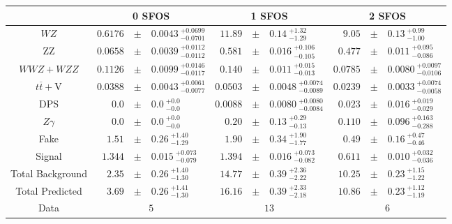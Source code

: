 \renewcommand{\tabcolsep}{2pt}
\begin{tabular}{c|rclrclrcl}
\hline
\hline
 & \multicolumn{3}{c}{0 SFOS} & \multicolumn{3}{c}{1 SFOS} & \multicolumn{3}{c}{2 SFOS}\\ 
\hline
$WZ$ &  $0.6176 $&$\pm$&$ 0.0043~^{+0.0699}_{-0.0701}$ &  $11.89 $&$\pm$&$ 0.14~^{+1.32}_{-1.29}$ &  $9.05 $&$\pm$&$ 0.13~^{+0.99}_{-1.00}$\\ 
ZZ &  $0.0658 $&$\pm$&$ 0.0039~^{+0.0112}_{-0.0112}$ &  $0.581 $&$\pm$&$ 0.016~^{+0.106}_{-0.105}$ &  $0.477 $&$\pm$&$ 0.011~^{+0.095}_{-0.086}$\\ 
$WWZ+WZZ$ &  $0.1126 $&$\pm$&$ 0.0099~^{+0.0146}_{-0.0117}$ &  $0.140 $&$\pm$&$ 0.011~^{+0.015}_{-0.013}$ &  $0.0785 $&$\pm$&$ 0.0080~^{+0.0097}_{-0.0106}$\\ 
$t\overline{t}+$V &  $0.0388 $&$\pm$&$ 0.0043~^{+0.0061}_{-0.0077}$ &  $0.0503 $&$\pm$&$ 0.0048~^{+0.0074}_{-0.0089}$ &  $0.0239 $&$\pm$&$ 0.0033~^{+0.0074}_{-0.0058}$\\ 
DPS &  $0.0 $&$\pm$&$ 0.0~^{+0.0}_{-0.0}$ &  $0.0088 $&$\pm$&$ 0.0080~^{+0.0080}_{-0.0084}$ &  $0.023 $&$\pm$&$ 0.016~^{+0.019}_{-0.029}$\\ 
$Z\gamma$ &  $0.0 $&$\pm$&$ 0.0~^{+0.0}_{-0.0}$ &  $0.20 $&$\pm$&$ 0.13~^{+0.29}_{-0.13}$ &  $0.110 $&$\pm$&$ 0.096~^{+0.163}_{-0.288}$\\ 
Fake &  $1.51 $&$\pm$&$ 0.26~^{+1.40}_{-1.29}$ &  $1.90 $&$\pm$&$ 0.34~^{+1.90}_{-1.77}$ &  $0.49 $&$\pm$&$ 0.16~^{+0.47}_{-0.46}$\\ 
Signal &  $1.344 $&$\pm$&$ 0.015~^{+0.073}_{-0.079}$ &  $1.394 $&$\pm$&$ 0.016~^{+0.073}_{-0.082}$ &  $0.611 $&$\pm$&$ 0.010~^{+0.032}_{-0.036}$\\ 
\hline
Total Background &  $2.35 $&$\pm$&$ 0.26~^{+1.40}_{-1.30}$ &  $14.77 $&$\pm$&$ 0.39~^{+2.36}_{-2.22}$ &  $10.25 $&$\pm$&$ 0.23~^{+1.15}_{-1.22}$\\ 
Total Predicted &  $3.69 $&$\pm$&$ 0.26~^{+1.41}_{-1.30}$ &  $16.16 $&$\pm$&$ 0.39~^{+2.33}_{-2.18}$ &  $10.86 $&$\pm$&$ 0.23~^{+1.12}_{-1.19}$\\ 
\hline
Data &  \multicolumn{3}{c}{$5$} &  \multicolumn{3}{c}{$13$} &  \multicolumn{3}{c}{$6$}\\ 
\hline
\end{tabular}
